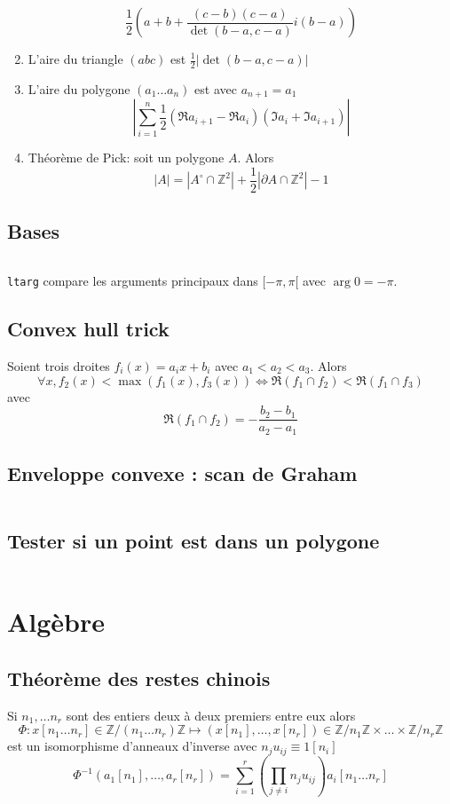 \documentclass[10pt,twocolumn]{article}
\newcommand{\Z}{\mathbb{Z}}
\newcommand{\abs}[1]{\left\lvert{ #1 }\right\rvert}
\begin{document}
\begin{enumerate}
    $$
        \frac 1 2 \left(a + b + \frac{(c - b)(c - a)}{\det(b - a, c - a)}i(b - a)\right)
    $$
    \item L'aire du triangle $(abc)$ est $\frac 1 2 \abs{\det(b - a, c - a)}$
    \item L'aire du polygone $(a_1\dots a_n)$ est avec $a_{n + 1} = a_1$
    $$
        \abs{\sum_{i = 1}^n \frac 1 2 (\Re a_{i + 1} - \Re a_i)(\Im a_i + \Im a_{i+1})}
    $$
    \item Th\'eor\`eme de Pick: soit un polygone $A$. Alors
    $$
        \abs{A} = \abs{A^\circ \cap \Z^2} + \frac 1 2 \abs{\partial A \cap \Z^2} - 1
    $$
\end{enumerate}

\subsection{Bases}
\inputminted[breaklines,tabsize=4]{cpp}{code/geometry.cpp}
\texttt{ltarg} compare les arguments principaux dans $[-\pi, \pi[$ avec $\arg 0 = -\pi$.

\subsection{Convex hull trick}

Soient trois droites $f_i(x) = a_ix + b_i$ avec $a_1 < a_2 < a_3$. Alors
$$
    \forall x, f_2(x) < \max(f_1(x), f_3(x))
    \iff \Re(f_1 \cap f_2) < \Re(f_1 \cap f_3)
$$
avec
$$
    \Re(f_1 \cap f_2) = -\frac{b_2 - b_1}{a_2 - a_1}
$$

\subsection{Enveloppe convexe : scan de Graham}
\inputminted[breaklines,tabsize=4]{cpp}{code/graham.cpp}

\subsection{Tester si un point est dans un polygone}
\inputminted[breaklines,tabsize=4]{cpp}{code/inside.cpp}

\section{Algèbre}
\subsection{Th\'eor\`eme des restes chinois}
Si $n_1, \dots n_r$ sont des entiers deux \`a deux premiers entre eux alors
$$
    \Phi : x[n_1\dots n_r] \in \Z/(n_1\dots n_r)\Z \mapsto (x[n_1], \dots, x[n_r]) \in \Z/n_1\Z \times \dots \times \Z/n_r\Z
$$
est un isomorphisme d'anneaux d'inverse avec $n_ju_{ij} \equiv 1 [n_i]$
$$
    \Phi^{-1}(a_1[n_1], \dots, a_r[n_r]) = \sum_{i = 1}^r \left(\prod_{j \neq i}n_j u_{ij} \right) a_i [n_1\dots n_r]
$$
\end{document}

